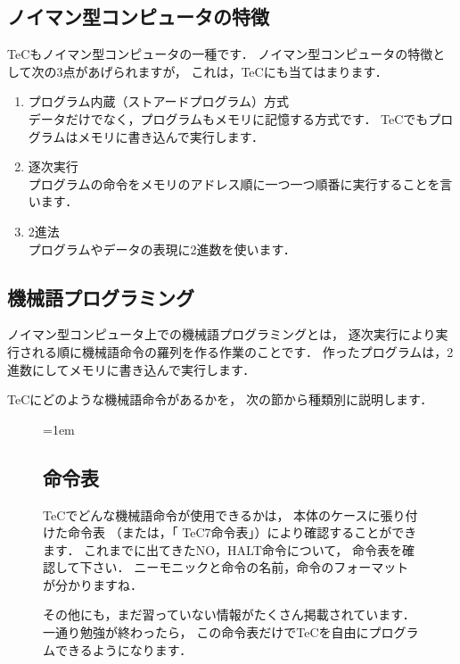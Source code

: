 \subsection{ノイマン型コンピュータの特徴}
TeCもノイマン型コンピュータの一種です．
ノイマン型コンピュータの特徴として次の3点があげられますが，
これは，TeCにも当てはまります．
\begin{enumerate}
\item プログラム内蔵（ストアードプログラム）方式 \\
  データだけでなく，プログラムもメモリに記憶する方式です．
  TeCでもプログラムはメモリに書き込んで実行します．
\item 逐次実行 \\
  プログラムの命令をメモリのアドレス順に一つ一つ順番に実行することを言います．
\item 2進法 \\
  プログラムやデータの表現に2進数を使います．
\end{enumerate}

\subsection{機械語プログラミング}
ノイマン型コンピュータ上での機械語プログラミングとは，
逐次実行により実行される順に機械語命令の羅列を作る作業のことです．
作ったプログラムは，2進数にしてメモリに書き込んで実行します．

TeCにどのような機械語命令があるかを，
次の節から種類別に説明します．

\begin{figure}[btp]
  \begin{framed}{\parindent=1em
      \subsection*{命令表}
      TeCでどんな機械語命令が使用できるかは，
      本体のケースに張り付けた命令表
      （または，「 TeC7命令表」）により確認することができます．
      これまでに出てきたNO，HALT命令について，
      命令表を確認して下さい．
      ニーモニックと命令の名前，命令のフォーマットが分かりますね．

      その他にも，まだ習っていない情報がたくさん掲載されています．
      一通り勉強が終わったら，
      この命令表だけでTeCを自由にプログラムできるようになります．
  }\end{framed}
\end{figure}

